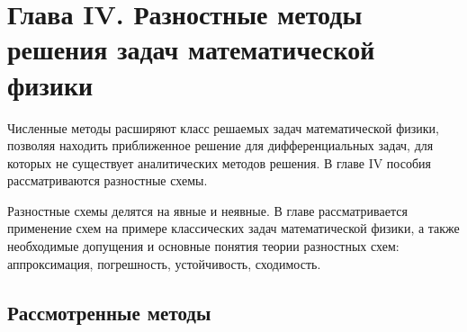 \newpage
{}
\pagestyle{empty}
\vspace{0.5cm}

\section*{Глава IV. Разностные методы решения задач математической физики}
Численные методы расширяют класс решаемых задач математической физики, позволяя находить приближенное решение для дифференциальных задач, для которых не существует аналитических методов решения. В главе IV пособия рассматриваются разностные схемы.

Разностные схемы делятся на явные и неявные. В главе рассматривается применение схем на примере классических задач математической физики, а также необходимые допущения и основные понятия теории разностных схем: аппроксимация, погрешность, устойчивость, сходимость.

\subsection{Рассмотренные методы}
